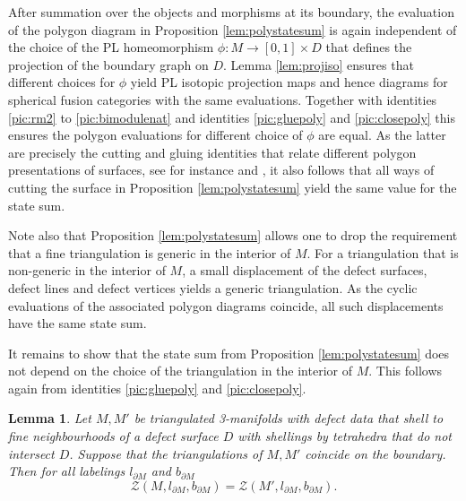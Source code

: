 \documentclass[1.5pt, a4paper]{article}
\newtheorem{lemma}[theorem]{Lemma}
\begin{document}
After summation over the objects and morphisms at its boundary, the evaluation of the polygon diagram in Proposition \ref{lem:polystatesum} is again independent of the choice of the  PL homeomorphism $\phi: M\to [0,1]\times D$ that defines the projection of the boundary graph on $D$. Lemma \ref{lem:projiso} ensures that different choices for $\phi$ yield PL isotopic projection maps and hence diagrams for spherical fusion categories with the same evaluations. Together with identities   \eqref{pic:rm2} to \eqref{pic:bimodulenat} 
and identities \eqref{pic:gluepoly} and \eqref{pic:closepoly} this ensures the polygon evaluations for different choice of $\phi$ are equal. 
As the latter  are precisely the cutting and gluing identities that relate different polygon presentations of surfaces, see for instance \cite[Ch.~6]{Lee} and \cite[Ch.~6.38 and 6.40]{ST}, it also follows that  all ways of cutting the surface in Proposition \ref{lem:polystatesum} 
yield the same value for the state sum. 

Note also that Proposition \ref{lem:polystatesum}  allows one to  drop the requirement that a fine triangulation is generic in the interior of $M$.
For a triangulation that is non-generic in the interior of $M$, a small displacement of the defect surfaces, defect lines and defect vertices yields a generic triangulation. As the cyclic evaluations of the associated polygon diagrams coincide, all such displacements have the same state sum.



It remains to show that the state sum from Proposition \ref{lem:polystatesum}  does not depend on the choice of the triangulation in the interior of $M$.  
This follows again from identities \eqref{pic:gluepoly} and \eqref{pic:closepoly}.


\begin{lemma} \label{lem:subdivide}
Let $M,M'$ be triangulated 3-manifolds with defect data that shell to fine neighbourhoods of a defect surface $D$ with shellings by tetrahedra that do not intersect $D$. Suppose that the triangulations of $M,M'$ coincide on the boundary. Then for all labelings $l_{\partial M}$ and $b_{\partial M}$ 
$$
\mathcal Z(M,l_{\partial M}, b_{\partial M})=\mathcal Z(M',l_{\partial M}, b_{\partial M}).
$$
\end{lemma}
\end{document}
